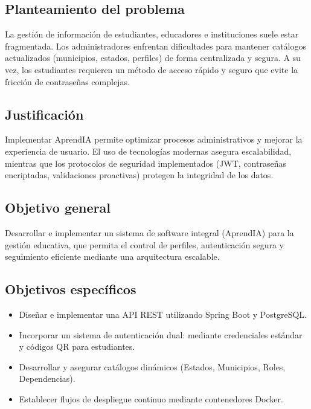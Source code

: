 \documentclass[12pt, a4paper]{article}
\begin{document}
\subsection{Planteamiento del problema}
La gestión de información de estudiantes, educadores e instituciones suele estar fragmentada. Los administradores enfrentan dificultades para mantener catálogos actualizados (municipios, estados, perfiles) de forma centralizada y segura. A su vez, los estudiantes requieren un método de acceso rápido y seguro que evite la fricción de contraseñas complejas.

\subsection{Justificación}
Implementar AprendIA permite optimizar procesos administrativos y mejorar la experiencia de usuario. El uso de tecnologías modernas asegura escalabilidad, mientras que los protocolos de seguridad implementados (JWT, contraseñas encriptadas, validaciones proactivas) protegen la integridad de los datos.

\subsection{Objetivo general}
Desarrollar e implementar un sistema de software integral (AprendIA) para la gestión educativa, que permita el control de perfiles, autenticación segura y seguimiento eficiente mediante una arquitectura escalable.

\subsection{Objetivos específicos}
\begin{itemize}
    \item Diseñar e implementar una API REST utilizando Spring Boot y PostgreSQL.
    \item Incorporar un sistema de autenticación dual: mediante credenciales estándar y códigos QR para estudiantes.
    \item Desarrollar y asegurar catálogos dinámicos (Estados, Municipios, Roles, Dependencias).
    \item Establecer flujos de despliegue continuo mediante contenedores Docker.
\end{itemize}
\end{document}
